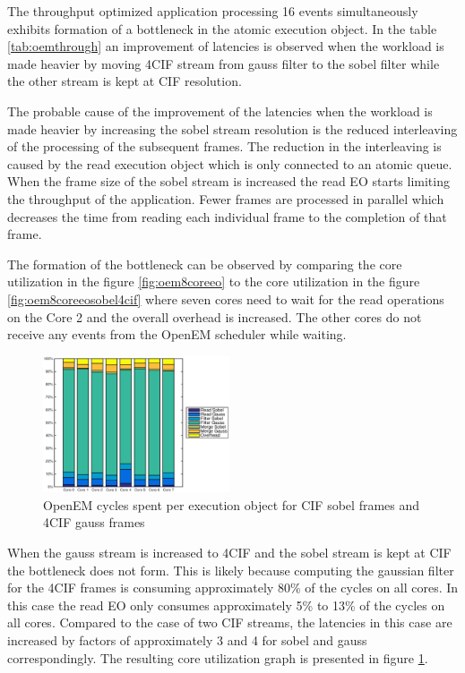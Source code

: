 The throughput optimized application processing 16 events simultaneously exhibits formation of a bottleneck in the atomic execution object. In the table \ref{tab:oemthrough} an improvement of latencies is observed when the workload is made heavier by moving 4CIF stream from gauss filter to the sobel filter while the other stream is kept at CIF resolution.

The probable cause of the improvement of the latencies when the workload is made heavier by increasing the sobel stream resolution is the reduced interleaving of the processing of the subsequent frames. The reduction in the interleaving is caused by the read execution object which is only connected to an atomic queue. When the frame size of the sobel stream is increased the read EO starts limiting the throughput of the application. Fewer frames are processed in parallel which decreases the time from reading each individual frame to the completion of that frame.

The formation of the bottleneck can be observed by comparing the core utilization in the figure \ref{fig:oem8coreeo} to the core utilization in the figure \ref{fig:oem8coreeosobel4cif} where seven cores need to wait for the read operations on the Core 2 and the overall overhead is increased. The other cores do not receive any events from the OpenEM scheduler while waiting.

\begin{figure}[h]
    \begin{center}
        \includegraphics[width=0.49\textwidth]{images/openem_sobelcif_gauss4cif_eo.eps}
        \caption{OpenEM cycles spent per execution object for CIF sobel frames
        and 4CIF gauss frames}
        \label{fig:oem8coreeogauss4cif}
    \end{center}
\end{figure}

When the gauss stream is increased to 4CIF and the sobel stream is kept at CIF the bottleneck does not form. This is likely because computing the gaussian filter for the 4CIF frames is consuming approximately 80\% of the cycles on all cores. In this case the read EO only consumes approximately 5\% to 13\% of the cycles on all cores. Compared to the case of two CIF streams, the latencies in this case are increased by factors of approximately 3 and 4 for sobel and gauss correspondingly. The resulting core utilization graph is presented in figure \ref{fig:oem8coreeogauss4cif}.
\FloatBarrier
